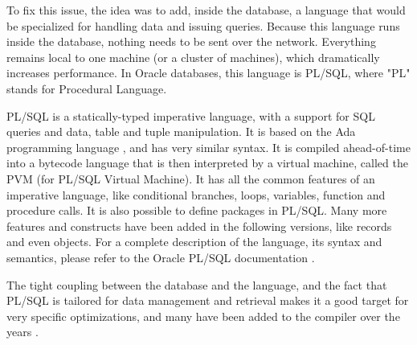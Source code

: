 \documentclass[twoside,11pt,a4paper]{article}
\begin{document}

To fix this issue, the idea was to add, inside the database, a language that would be specialized for handling data and issuing queries. Because this language runs inside the database, nothing needs to be sent over the network. Everything remains local to one  machine (or a cluster of machines), which dramatically increases performance. In Oracle databases, this language is PL/SQL, where "PL" stands for Procedural Language.

PL/SQL is a statically-typed imperative language, with a support for SQL queries and data, table and tuple manipulation. It is based on the Ada programming language \cite{adadoc}, and has very similar syntax. It is compiled ahead-of-time into a bytecode language that is then interpreted by a virtual machine, called the PVM (for PL/SQL Virtual Machine). It has all the common features of an imperative language, like conditional branches, loops, variables, function and procedure calls. It is also possible to define packages in PL/SQL. Many more features and constructs have been added in the following versions, like records and even objects. For a complete description of the language, its syntax and semantics, please refer to the Oracle PL/SQL documentation \cite{plsdoc}.

The tight coupling between the database and the language, and the fact that PL/SQL is tailored for data management and retrieval makes it a good target for very specific optimizations, and many have been added to the compiler over the years \cite{freedomplsopt}.

\end{document}
